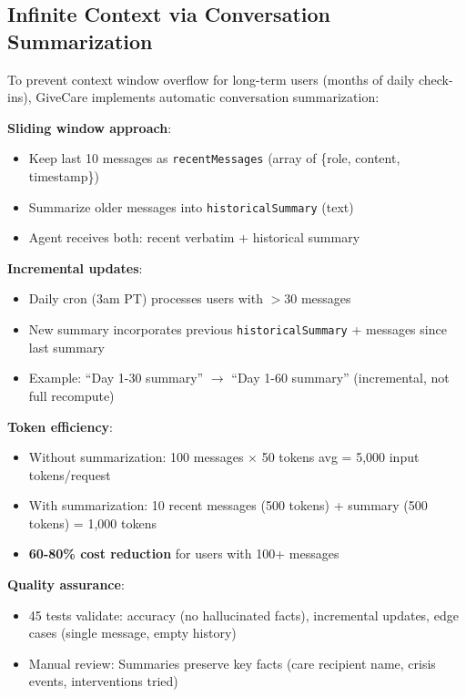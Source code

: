 \documentclass{article}
\begin{document}
%
\subsection{Infinite Context via Conversation Summarization}%
\label{subsec:InfiniteContextviaConversationSummarization}%
To prevent context window overflow for long-term users (months of daily check-ins), GiveCare implements automatic conversation summarization:

\textbf{Sliding window approach}:
\begin{itemize}
    \item Keep last 10 messages as \texttt{recentMessages} (array of \{role, content, timestamp\})
    \item Summarize older messages into \texttt{historicalSummary} (text)
    \item Agent receives both: recent verbatim + historical summary
\end{itemize}

\textbf{Incremental updates}:
\begin{itemize}
    \item Daily cron (3am PT) processes users with $>$30 messages
    \item New summary incorporates previous \texttt{historicalSummary} + messages since last summary
    \item Example: ``Day 1-30 summary'' $\rightarrow$ ``Day 1-60 summary'' (incremental, not full recompute)
\end{itemize}

\textbf{Token efficiency}:
\begin{itemize}
    \item Without summarization: 100 messages $\times$ 50 tokens avg = 5,000 input tokens/request
    \item With summarization: 10 recent messages (500 tokens) + summary (500 tokens) = 1,000 tokens
    \item \textbf{60-80\% cost reduction} for users with 100+ messages
\end{itemize}

\textbf{Quality assurance}:
\begin{itemize}
    \item 45 tests validate: accuracy (no hallucinated facts), incremental updates, edge cases (single message, empty history)
    \item Manual review: Summaries preserve key facts (care recipient name, crisis events, interventions tried)
\end{itemize}
\end{document}
